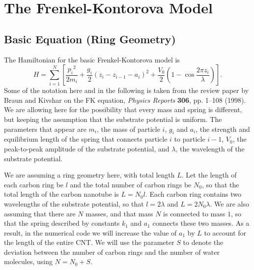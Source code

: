 \documentclass[11pt]{article}
\begin{document}
\section{The Frenkel-Kontorova Model}

\subsection{Basic Equation (Ring Geometry)}

The Hamiltonian for the basic Frenkel-Kontorova model is
\[
H=\sum_{i=1}^N\left[\frac{{p_i}^2}{2m_i}
	+\frac{g_i}{2}\left(z_i-z_{i-1}-a_i\right)^2
	+\frac{V_0}{2}\left(1-\cos\frac{2\pi z_i}{\lambda}\right)\right].
\]
Some of the notation here and in the following is taken from the review paper by Braun and Kivshar on the FK equation, \textit{Physics Reports} \textbf{306}, pp. 1--108 (1998). We are allowing here for the possibility that every mass and spring is different, but keeping the assumption that the substrate potential is uniform. The parameters that appear are $m_i$, the mass of particle $i$, $g_i$ and $a_i$, the strength and equilibrium length of the spring that connects particle $i$ to particle $i-1$, $V_0$, the peak-to-peak amplitude of the substrate potential, and $\lambda$, the wavelength of the substrate potential.

We are assuming a ring geometry here, with total length $L$. Let the length of each carbon ring be $l$ and the total number of carbon rings be $N_0$, so that the total length of the carbon nanotube is $L=N_0l$. Each carbon ring contains two wavelengths of the substrate potential, so that $l=2\lambda$ and $L=2N_0\lambda$. We are also assuming that there are $N$ masses, and that mass $N$ is connected to mass $1$, so that the spring described by constants $k_1$ and $a_1$ connects these two masses. As a result, in the numerical code we will increase the value of $a_1$ by $L$ to account for the length of the entire CNT. We will use the parameter $S$ to denote the deviation between the number of carbon rings and the number of water molecules, using $N=N_0+S$.
\end{document}
